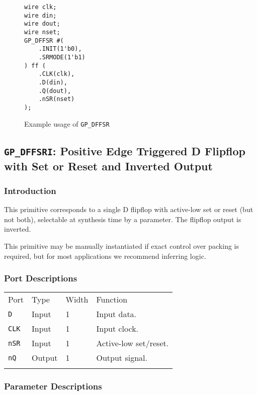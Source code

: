 \documentclass[11pt]{article}
\newcommand{\tokenstyle}[1]{\texttt{#1}}
\newcommand{\whenstyle}[1]{{\fontseries{sb}\selectfont#1}}
\newcommand{\thinhline}{\Xhline{1\arrayrulewidth}}
\newcommand{\thickhline}{\Xhline{2.5\arrayrulewidth}}
\begin{document}
\begin{figure}[h]
\begin{lstlisting}
wire clk;
wire din;
wire dout;
wire nset;
GP_DFFSR #(
	.INIT(1'b0),
	.SRMODE(1'b1)
) ff (
	.CLK(clk),
	.D(din),
	.Q(dout),
	.nSR(nset)
);
\end{lstlisting}
\caption{Example usage of \tokenstyle{GP\_DFFSR}}
\label{gp-dffsr-example}
\end{figure}


\pagebreak
\subsection{\tokenstyle{GP\_DFFSRI}: Positive Edge Triggered D Flipflop with Set or Reset and Inverted Output}
\label{gp-dffsri}

\subsubsection{Introduction}
This primitive corresponds to a single D flipflop with active-low set or reset (but not both), selectable at synthesis
time by a parameter. The flipflop output is inverted.

This primitive may be manually instantiated if exact control over packing is required, but for most applications we
recommend inferring logic.

\subsubsection{Port Descriptions}

\begin{tabularx}{\textwidth}{lllX}
\thinhline
\whenstyle{Port} & \whenstyle{Type} & \whenstyle{Width} & \whenstyle{Function} \\
\thickhline
\tokenstyle{D} & Input & 1 & Input data. \\
\thinhline
\tokenstyle{CLK} & Input & 1 & Input clock. \\
\thinhline
\tokenstyle{nSR} & Input & 1 & Active-low set/reset. \\
\thinhline
\tokenstyle{nQ} & Output & 1 & Output signal. \\
\thinhline
\end{tabularx}

\subsubsection{Parameter Descriptions}
\end{document}
